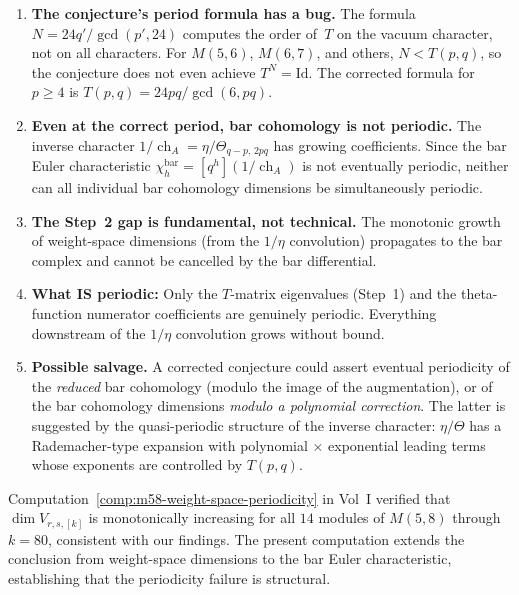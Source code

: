 \documentclass[11pt]{article}
\begin{document}
\begin{enumerate}[label=\textup{(\arabic*)}]
\item \textbf{The conjecture's period formula has a bug.}  The
  formula $N = 24q'/\gcd(p',24)$ computes the order of~$T$
  on the vacuum character, not on all characters.  For
  $M(5,6)$, $M(6,7)$, and others, $N < T(p,q)$,
  so the conjecture does not even achieve $T^N = \mathrm{Id}$.
  The corrected formula for $p \ge 4$ is
  $T(p,q) = 24pq/\gcd(6, pq)$.

\item \textbf{Even at the correct period, bar cohomology is
  not periodic.}  The inverse character
  $1/\operatorname{ch}_A = \eta/\Theta_{q-p,\,2pq}$ has growing
  coefficients.  Since the bar Euler characteristic
  $\chi^{\operatorname{bar}}_h = [q^h](1/\operatorname{ch}_A)$
  is not eventually periodic, neither can all individual
  bar cohomology dimensions be simultaneously periodic.

\item \textbf{The Step~2 gap is fundamental, not technical.}
  The monotonic growth of weight-space dimensions (from the
  $1/\eta$ convolution) propagates to the bar complex and
  cannot be cancelled by the bar differential.

\item \textbf{What IS periodic:} Only the $T$-matrix
  eigenvalues (Step~1) and the theta-function numerator
  coefficients are genuinely periodic.  Everything downstream
  of the $1/\eta$ convolution grows without bound.

\item \textbf{Possible salvage.}
  A corrected conjecture could assert eventual periodicity of
  the \emph{reduced} bar cohomology (modulo the image of the
  augmentation), or of the bar cohomology dimensions
  \emph{modulo a polynomial correction}.  The latter is
  suggested by the quasi-periodic structure of the inverse
  character: $\eta/\Theta$ has a Rademacher-type expansion
  with polynomial$\,\times\,$exponential leading terms whose
  exponents are controlled by $T(p,q)$.
\end{enumerate}

\begin{remark}
Computation~\ref*{comp:m58-weight-space-periodicity} in Vol~I
verified that $\dim V_{r,s,[k]}$ is monotonically increasing
for all $14$ modules of $M(5,8)$ through $k = 80$, consistent
with our findings.  The present computation extends the
conclusion from weight-space dimensions to the bar Euler
characteristic, establishing that the periodicity failure
is structural.
\end{remark}
\end{document}
